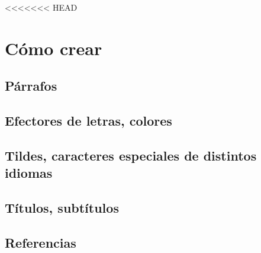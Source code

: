 \documentclass[10pt,journal,compsoc]{IEEEtran}
\begin{document}
<<<<<<< HEAD
\renewcommand{\thesubsection}{\thesection.\alph{subsection}}

\section{C\'omo crear}
	\subsection{P\'arrafos}	
	\subsection{Efectores de letras, colores}
	\subsection{Tildes, caracteres especiales de distintos idiomas}
	\subsection{T\'itulos, subt\'itulos}
	\subsection{Referencias}
\end{document}
